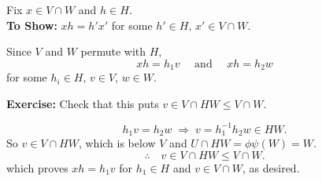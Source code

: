 
\begin{frame}[fragile,label=ComputationsForProofOfIntervalIsomorphism,shrink=5]{}
      Fix $x \in V \cap W$ and $h\in H$.\\[6pt]  
      {\bf To Show:} $xh = h'x'$ for some $h'\in H, \, x'\in V\cap W$.
\end{frame}
\begin{frame}[fragile,label=ComputationsForProofOfIntervalIsomorphism,shrink=5]{}
          Since $V$ and $W$ permute with $H$, 
          \[xh = h_1 v \quad \text{ and } \quad xh = h_2 w\]
          for some $h_i\in H,\,v \in V,\, w \in W$.
\end{frame}
\begin{frame}[fragile,label=ComputationsForProofOfIntervalIsomorphism,shrink=5]{}
          {\bf Exercise:} Check that this puts $v\in V \cap HW \leq V \cap W$. 
\end{frame}
\begin{frame}[fragile,label=ComputationsForProofOfIntervalIsomorphism,shrink=5]{}
            \[h_1 v = h_2 w \;\Rightarrow \; v = h_1^{-1}h_2 w \in HW.\]
            So $v\in V \cap HW$, which is below $V$ and
            $U\cap HW = \phi \psi(W) = W$.  
            \[\therefore \quad v \in V \cap HW \leq V \cap W.\]
            which proves $xh = h_1 v$ for $h_1\in H$ and $v \in V\cap W$, as
            desired.
\end{frame}

